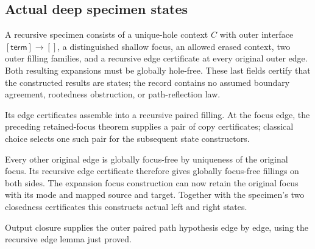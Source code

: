 \subsection{Actual deep specimen states}
\begin{definition}\label{term:deep-specimen}
A recursive specimen consists of a unique-hole context $C$ with outer
interface $[\mathsf{term}]\to[]$, a distinguished shallow focus, an
allowed erased context, two outer filling families, and a recursive
edge certificate at every original outer edge. Both resulting
expansions must be globally hole-free. These last fields certify that
the constructed results are states; the record contains no assumed
boundary agreement, rootedness obstruction, or path-reflection law.
\end{definition}

Its edge certificates assemble into a recursive paired filling.
At the focus edge, the preceding retained-focus theorem supplies a
pair of copy certificates; classical choice selects one such pair
for the subsequent state constructors.

Every other original edge is globally focus-free by uniqueness of
the original focus. Its recursive edge certificate therefore gives
globally focus-free fillings on both sides. The expansion focus
construction can now retain the original focus with its mode and
mapped source and target. Together with the specimen's two closedness
certificates this constructs actual left and right states.

Output closure supplies the outer paired path hypothesis edge by edge,
using the recursive edge lemma just proved.


